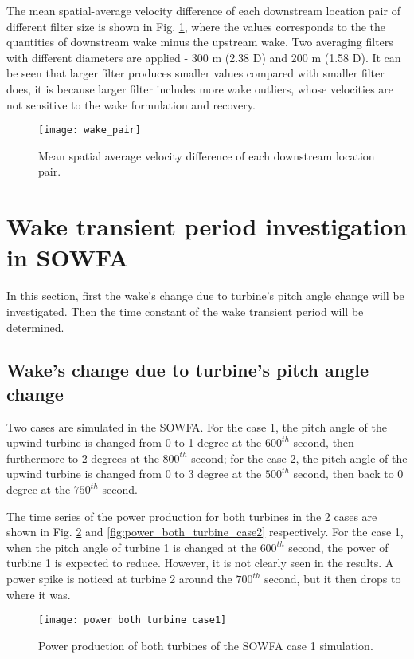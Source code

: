 \documentclass{umthesis}
\begin{document}
The mean spatial-average velocity difference of each downstream location pair of different filter size is shown in Fig. \ref{fig:wake_pair}, where the values corresponds to the the quantities of downstream wake minus the upstream wake. Two averaging filters with different diameters are applied - 300 m (2.38 D) and 200 m (1.58 D). It can be seen that larger filter produces smaller values compared with smaller filter does, it is because larger filter includes more wake outliers, whose velocities are not sensitive to the wake formulation and recovery.

\begin{figure}
  \centering
  \texttt{[image: wake\_pair]}
  \caption{Mean spatial average velocity difference of each downstream location pair.}\label{fig:wake_pair}
\end{figure}


\section{Wake transient period investigation in SOWFA}\label{sec:SOWFA_transient}
In this section, first the wake's change due to turbine's pitch angle change will be investigated. Then the time constant of the wake transient period will be determined.

\subsection{Wake's change due to turbine's pitch angle change}
Two cases are simulated in the SOWFA. For the case 1, the pitch angle of the upwind turbine is changed from 0 to 1 degree at the $600^{th}$ second, then furthermore to 2 degrees at the $800^{th}$ second; for the case 2, the pitch angle of the upwind turbine is changed from 0 to 3 degree at the $500^{th}$ second, then back to 0 degree at the $750^{th}$ second. 

The time series of the power production for both turbines in the 2 cases are shown in Fig. \ref{fig:power_both_turbine_case1} and \ref{fig:power_both_turbine_case2} respectively. For the case 1, when the pitch angle of turbine 1 is changed at the $600^{th}$ second, the power of turbine 1 is expected to reduce. However, it is not clearly seen in the results. A power spike is noticed at turbine 2 around the $700^{th}$ second, but it then drops to where it was. 

\begin{figure}
  \centering
  \texttt{[image: power\_both\_turbine\_case1]}
  \caption{Power production of both turbines of the SOWFA case 1 simulation.}\label{fig:power_both_turbine_case1}
\end{figure}
\end{document}
